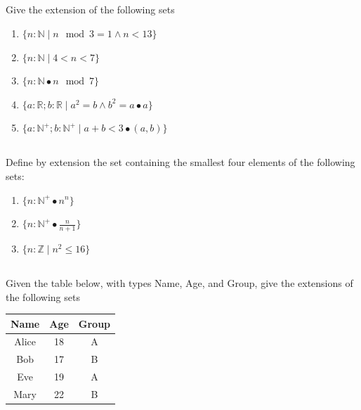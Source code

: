 \documentclass[twocolumn]{article}
\newcommand\mrk[1]{}
\begin{document}
\subsection{}

    Give the extension of the following sets

    \begin{enumerate}
        \item $\{ n : \mathbb{N} \mid n \mod 3 = 1 \wedge n < 13 \} $ \mrk{1}
        \item $\{ n : \mathbb{N} \mid 4 < n < 7 \} $ \mrk{1}
        \item $ \{ n : \mathbb{N} \bullet n \mod 7 \} $ \mrk{1}
        \item $\{ a : \mathbb{R}; b : \mathbb{R}  \mid a^2 = b \wedge b^2 = a \bullet a \} $ \mrk{1}
        \item $\{ a : \mathbb{N}^+; b : \mathbb{N}^+  \mid a + b < 3 \bullet (a, b) \} $ \mrk{1}
    \end{enumerate}


\subsection{}

    Define by extension the set containing the smallest four elements of the following sets:

    \begin{enumerate}
        \item $ \{ n : \mathbb{N}^+ \bullet n^n \} $ \mrk{1}
        \item $ \{ n : \mathbb{N}^+ \bullet \frac{n}{n+1} \} $ \mrk{1}
        \item $ \{ n : \mathbb{Z} \mid n^2 \leq 16  \} $ \mrk{1}
    \end{enumerate}

\subsection{}

    Given the table below, with types Name, Age, and Group, give the extensions of the following sets

    \begin{table}[h!]
        \centering
        \begin{tabular}{c | c | c }
            \toprule
            Name & Age & Group \\
            \midrule
            Alice & 18 & A  \\
            Bob & 17 & B  \\
            Eve & 19 & A \\
            Mary & 22 & B \\
            \bottomrule
        \end{tabular}
    \end{table}
\end{document}
